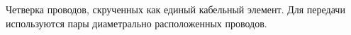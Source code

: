 Четверка проводов, скрученных как единый кабельный элемент.
Для передачи используются пары диаметрально расположенных проводов.